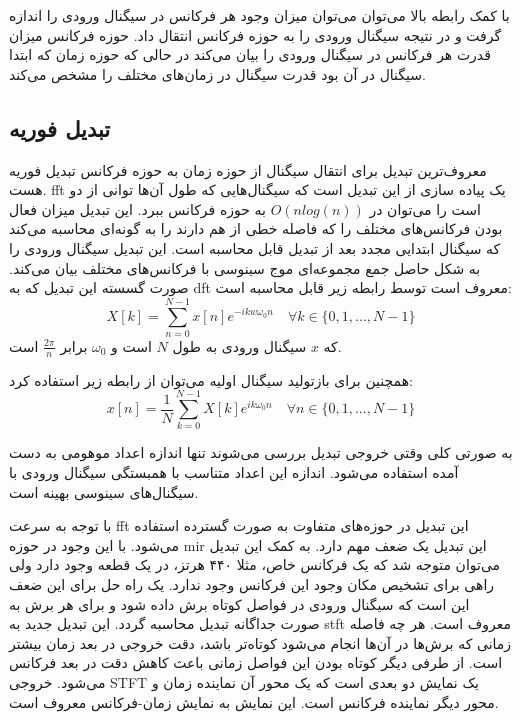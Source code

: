 با کمک رابطه بالا می‌توان می‌توان میزان وجود هر فرکانس در سیگنال ورودی را اندازه
گرفت و در نتیجه سیگنال ورودی را به حوزه فرکانس انتقال داد. حوزه فرکانس میزان
قدرت هر فرکانس در سیگنال ورودی را بیان می‌کند در حالی که حوزه زمان که ابتدا سیگنال
در آن بود قدرت سیگنال در زمان‌های مختلف را مشخص می‌کند.

\subsection{تبدیل فوریه}
معروف‌ترین تبدیل برای انتقال سیگنال از حوزه زمان به حوزه فرکانس تبدیل فوریه هست.
\gls{fft} یک پیاده سازی از این تبدیل است که سیگنال‌هایی که طول آن‌ها توانی از دو
است را می‌توان در $O(nlog(n))$ به حوزه فرکانس ببرد. این تبدیل میزان فعال بودن
فرکانس‌های مختلف را که فاصله خطی از هم دارند را به گونه‌ای محاسبه می‌کند که
سیگنال ابتدایی مجدد بعد از تبدیل قابل محاسبه است. این تبدیل سیگنال ورودی را به
شکل حاصل جمع مجموعه‌ای موج سینوسی با فرکانس‌های مختلف بیان می‌کند. صورت گسسته
این تبدیل که به \gls{dft} معروف است توسط رابطه زیر قابل محاسبه است:
\begin{equation}
    X[k] = \sum_{n=0}^{N-1} x[n]e^{- ikw\omega_0n} \quad \forall k \in \{ 0, 1, ..., N-1 \}
\end{equation}
که $x$ سیگنال ورودی به طول $N$ است و $\omega_0$ برابر $\frac{2\pi}{n}$ است.

همچنین برای بازتولید سیگنال اولیه می‌توان از رابطه زیر استفاده کرد:
\begin{equation}
    x[n] = \frac{1}{N}\sum_{k=0}^{N-1} X[k]e^{ik\omega_0n} \quad \forall n \in \{ 0, 1, ..., N-1 \}
\end{equation}

به صورتی کلی وقتی خروجی تبدیل بررسی می‌شوند تنها اندازه اعداد موهومی به دست آمده
استفاده می‌شود. اندازه این اعداد متناسب با همبستگی سیگنال ورودی با سیگنال‌های
سینوسی بهینه است.

با توجه به سرعت \gls{fft} این تبدیل در حوزه‌های متفاوت به صورت گسترده استفاده
می‌شود. با این وجود در حوزه \gls{mir} این تبدیل یک ضعف مهم دارد. به کمک این
تبدیل می‌توان متوجه شد که یک فرکانس خاص، مثلا ۴۴۰ هرتز، در یک قطعه وجود دارد ولی
راهی برای تشخیص مکان وجود این فرکانس وجود ندارد. یک راه حل برای این ضعف این است
که سیگنال ورودی در فواصل کوتاه برش داده شود و برای هر برش به صورت جداگانه تبدیل
محاسبه گردد. این تبدیل جدید به \gls{stft} معروف است. هر چه فاصله زمانی که برش‌ها
در آن‌ها انجام می‌شود کوتاه‌تر باشد، دقت خروجی در بعد زمان بیشتر است. از طرفی
دیگر کوتاه بودن این فواصل زمانی باعث کاهش دقت در بعد فرکانس می‌شود. خروجی
\gls{STFT} یک نمایش دو بعدی است که یک محور آن نماینده زمان و محور دیگر نماینده
فرکانس است. این نمایش به نمایش زمان-فرکانس معروف است.

